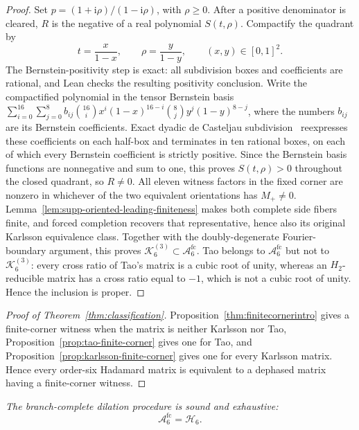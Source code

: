 \documentclass[aps,prx,reprint,nofootinbib,twoside,superscriptaddress,longbibliography,floatfix]{revtex4-2}
\theoremstyle{definition}
\newcommand{\I}{\mathrm i}
\newcommand{\HH}{\mathcal H}
\newcommand{\KK}{\mathcal K}
\newcommand{\FCAtlas}{\mathcal A}
\begin{document}
\begin{proof}
Set $p=(1+\I\rho)/(1-\I\rho)$, with $\rho\geq0$.  After a positive denominator is cleared, $R$ is the negative of a real polynomial $S(t,\rho)$.  Compactify the quadrant by
\begin{equation}
t=\frac{x}{1-x},\qquad \rho=\frac{y}{1-y},
\qquad (x,y)\in[0,1]^2.
\label{eq:supp-karlsson-compactification}
\end{equation}
{The Bernstein-positivity step is exact: all subdivision boxes and coefficients are rational, and Lean checks the resulting positivity conclusion.}
Write the compactified polynomial in the tensor Bernstein basis $\sum_{i=0}^{16}\sum_{j=0}^{8}b_{ij} \binom{16}{i}x^i(1-x)^{16-i} \binom{8}{j}y^j(1-y)^{8-j}$, where the numbers $b_{ij}$ are its Bernstein coefficients. Exact dyadic de Casteljau subdivision~\cite{Farouki2012} reexpresses these coefficients on each half-box and terminates in ten rational boxes, on each of which every Bernstein coefficient is strictly positive.  Since the Bernstein basis functions are nonnegative and sum to one, this proves $S(t,\rho)>0$ throughout the closed quadrant, so $R\neq0$. All eleven witness factors in the fixed corner are nonzero in whichever of the two equivalent orientations has $M_+\ne0$. Lemma~\ref{lem:supp-oriented-leading-finiteness} makes both complete side fibers finite, and forced completion recovers that representative, hence also its original Karlsson equivalence class. Together with the doubly-degenerate Fourier-boundary argument, this proves $\KK_6^{(3)}\subset\FCAtlas_6^{\mathrm{fc}}$. Tao belongs to $\FCAtlas_6^{\mathrm{fc}}$ but not to $\KK_6^{(3)}$: every cross ratio of Tao's matrix is a cubic root of unity, whereas an $H_2$-reducible matrix has a cross ratio equal to $-1$, which is not a cubic root of unity. Hence the inclusion is proper.
\end{proof}

\begin{proof}[Proof of Theorem~\ref{thm:classification}]
{Proposition~\ref{thm:finitecornerintro} gives a finite-corner witness when the matrix is neither Karlsson nor Tao, Proposition~\ref{prop:tao-finite-corner} gives one for Tao, and Proposition~\ref{prop:karlsson-finite-corner} gives one for every Karlsson matrix. Hence every order-six Hadamard matrix is equivalent to a dephased matrix having a finite-corner witness.}
\end{proof}

{\emph{The branch-complete dilation procedure is sound and exhaustive:}}
\begin{equation}
{\FCAtlas_6^{\mathrm{fc}}=\HH_6.}
\label{eq:supp-complete-classification}
\end{equation}
\end{document}
